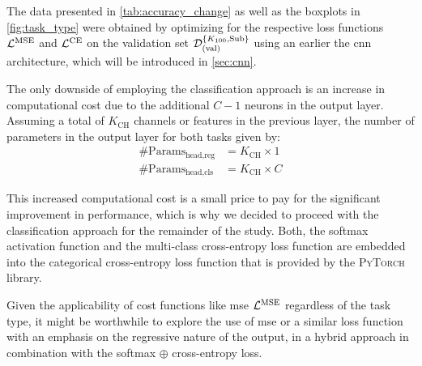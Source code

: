 The data presented in \autoref{tab:accuracy_change} as well as the boxplots in \autoref{fig:task_type} were obtained by optimizing for
the respective loss functions \( \mathcal{L}^{\text{MSE}} \) and \( \mathcal{L}^{\text{CE}} \) on the validation set \( \mathcal{D}^{\{K_{100},\text{Sub}\}}_{(\text{val})} \) using an
earlier the \gls{cnn} architecture, which will be introduced in \autoref{sec:cnn}.


The only downside of employing the classification approach is an increase in computational cost due to the
additional \( C - 1 \) neurons in the output layer. Assuming a total of \( K_{\text{CH}} \) channels or features in the
previous layer, the number of parameters in the output layer for both tasks given by:
\begin{align}
    \#\text{Params}_{\text{head,reg}} &= K_{\text{CH}} \times 1 \\
    \#\text{Params}_{\text{head,cls}} &= K_{\text{CH}} \times C
\end{align}

This increased computational cost is a small price to pay for the significant improvement in performance, which is
why we decided to proceed with the classification approach for the remainder of the study. Both, the softmax activation
function and the multi-class cross-entropy loss function are embedded into the categorical cross-entropy loss function
that is provided by the \textsc{PyTorch} library.

Given the applicability of cost functions like \gls{mse} \( \mathcal{L}^{\text{MSE}} \) regardless of the task type, it might
be worthwhile to explore the use of \gls{mse} or a similar loss function with an emphasis on the regressive nature of
the output, in a hybrid approach in combination with the softmax \( \oplus \) cross-entropy loss.
